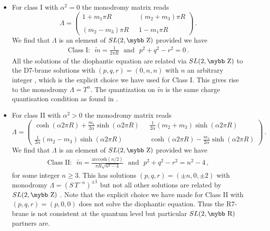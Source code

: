 \documentclass[12pt,a4paper]{article}
\def\bb#1{\hbox{\mybb#1}}
\begin{document}
\begin{itemize}
\item
For class I with $\alpha^2=0$ the monodromy matrix reads
\begin{equation}
  \Lambda = \left(
    \begin{array}{cc} 1 + m_1 \pi R &
     \ \ \ (m_2+m_3) \pi R \\
        &\\
     (m_2-m_3) \pi R &
     \ \ \ 1 - m_1 \pi R \end{array}
    \right) \,.\label{monI}
\end{equation}
We find that $\Lambda$  is an element of $SL(2,\bb{Z})$ provided we have
\begin{align}
  \text{Class I:~~} \tilde m = \frac{1}{2\pi R}
  \text{~~and~~} p^2+q^2-r^2=0 \,.
\end{align}
All the solutions of the diophantic equation are related
via $SL(2,\bb{Z})$ to the D7-brane solutions with $(p,q,r)=(0,n,n)$
with $n$ an arbitrary integer
\cite{DeWolfe:1998eu, DeWolfe:1998pr,Hull:2002wg},
which is the explicit choice we
have used for Class I. This gives rise to the monodromy
$\Lambda=T^n$. The quantization on $\tilde m$ is the same charge
quantisation condition as found in \cite{Bergshoeff:1996ui}.

\item
For class II with $\alpha^2>0$ the monodromy matrix reads
\begin{equation}
  \Lambda  = \left(
    \begin{array}{cc} \cosh(\alpha 2 \pi R) + \tfrac{m_1}{2\alpha} \sinh(\alpha 2 \pi R) &
     \ \ \ \tfrac{1}{2 \alpha} (m_2+m_3) \sinh(\alpha 2 \pi R) \\
        &\\
     \tfrac{1}{2 \alpha} (m_2-m_3) \sinh(\alpha 2 \pi R) &
     \ \ \ \cosh(\alpha 2 \pi R) - \tfrac{m_1}{2\alpha} \sinh(\alpha 2 \pi R) \end{array}
    \right) \, .
\end{equation}
We find that $\Lambda$  is an element of $SL(2,\bb{Z})$ provided we have
\begin{align}
  \text{Class II:~~} \tilde m = \frac{\text{arccosh}(n/2)}{\pi R\sqrt{n^2-4}}
  \text{~~and~~} p^2+q^2-r^2=n^2-4 \,,
\end{align}
for some integer $n \geq 3$. This has solutions $(p,q,r)=(\pm n,0,\pm 2)$ with
monodromy $\Lambda=(S \, T^{-n})^{\pm 1}$ but not all other solutions are
related by
$SL(2,\bb{Z})$ \cite{DeWolfe:1998eu, DeWolfe:1998pr}. Note that the explicit
choice we have made for Class II with $(p,q,r)=(p,0,0)$ does not solve
the diophantic equation. Thus the R7-brane is not consistent at the
quantum level but particular $SL(2,\bb{R})$ partners are.



\end{itemize}
\end{document}
